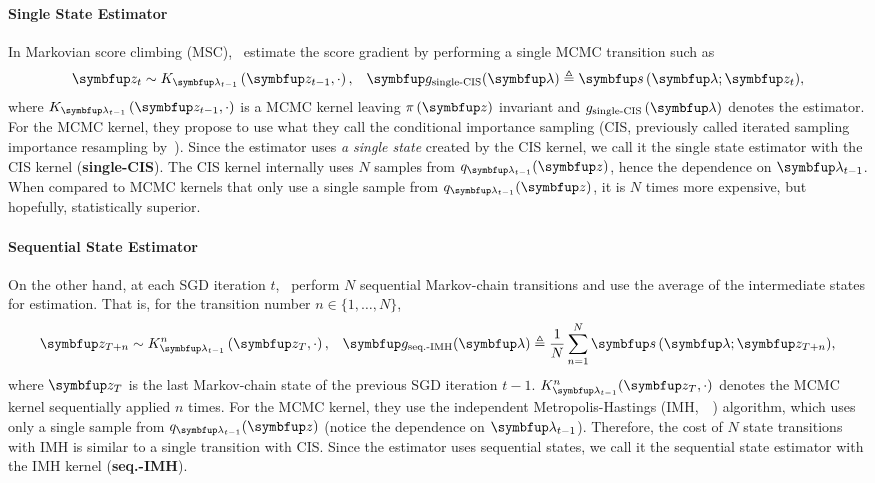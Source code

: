 \vspace{-0.05in}
\paragraph{Single State Estimator}
In Markovian score climbing (MSC),~\citet{NEURIPS2020_b2070693} estimate the score gradient by performing a single MCMC transition such as
\vspace{-0.05in}
\begin{align*}
  &\vz_t \sim K_{\vlambda_{t-1}}\left(\vz_{t-1}, \cdot \right),
  &\vg_{\text{single-CIS}}(\vlambda) \triangleq \vs\,(\vlambda; \vz_t),
\end{align*}
where \(K_{\vlambda_{t-1}}\left(\vz_{t-1}, \cdot\right)\) is a MCMC kernel leaving \(\pi\,(\vz)\) invariant and \(g_{\text{single-CIS}}\left(\vlambda\right)\) denotes the estimator.
For the MCMC kernel, they propose to use what they call the conditional importance sampling (CIS, previously called iterated sampling importance resampling by~\citet{andrieu_uniform_2018}).
Since the estimator uses \textit{a single state} created by the CIS kernel, we call it the single state estimator with the CIS kernel (\textbf{single-CIS}).
The CIS kernel internally uses \(N\) samples from \(q_{\vlambda_{t-1}}(\vz)\), hence the dependence on \(\vlambda_{t-1}\).
When compared to MCMC kernels that only use a single sample from \(q_{\vlambda_{t-1}}(\vz)\), it is \(N\) times more expensive, but hopefully, statistically superior.

\vspace{-0.08in}
\paragraph{Sequential State Estimator}
On the other hand, at each SGD iteration \(t\),~\citet{pmlr-v124-ou20a} perform \(N\) sequential Markov-chain transitions and use the average of the intermediate states for estimation.
That is, for the transition number \(n \in \{1, \ldots, N\}\),
\vspace{-0.05in}
\begin{align*}
  &\vz_{T+n} \sim K_{\vlambda_{t-1}}^n\left(\vz_{T}, \cdot \right),
  &\vg_{\text{seq.-IMH}}(\vlambda) \triangleq \frac{1}{N} \sum_{n=1}^N \vs\,(\vlambda; \vz_{T+n}),
\end{align*}
where \(\vz_T\) is the last Markov-chain state of the previous SGD iteration 
\(t-1\).
\(K^{n}_{\vlambda_{t-1}}(\vz_{T}, \cdot)\) denotes the MCMC kernel sequentially applied \(n\) times.
For the MCMC kernel, they use the independent Metropolis-Hastings (IMH,~\citealt[Algorithm 25]{robert_monte_2004}~\citealt{hastings_monte_1970}) algorithm, which uses only a single sample from \(q_{\vlambda_{t-1}}(\vz)\) (notice the dependence on \(\vlambda_{t-1}\)).
Therefore, the cost of \(N\) state transitions with IMH is similar to a single transition with CIS.
Since the estimator uses sequential states, we call it the sequential state estimator with the IMH kernel (\textbf{seq.-IMH}).

